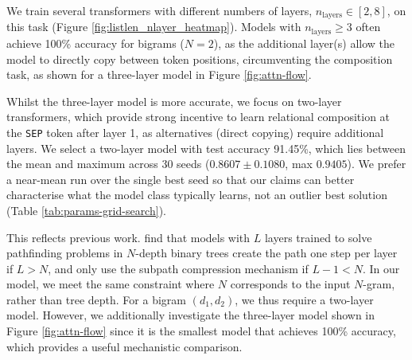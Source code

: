 We train several transformers with different numbers of layers, $n_\text{layers} \in [2,8]$, on this task (Figure \ref{fig:listlen_nlayer_heatmap}). 
Models with $n_\text{layers} \geq 3$ often achieve 100\% accuracy for bigrams ($N=2$), as the additional layer(s) allow the model to directly copy between token positions, circumventing the composition task, as shown for a three-layer model in Figure \ref{fig:attn-flow}. 

Whilst the three-layer model is more accurate, 
we focus on two-layer transformers, which provide strong incentive to learn relational composition at the \texttt{SEP} token after layer 1, as alternatives (direct copying) require additional layers. We select a two-layer model with test accuracy 91.45\%, which lies between the mean and maximum across 30 seeds ($0.8607 \pm 0.1080$, max $0.9405$). We prefer a near-mean run over the single best seed so that our claims can better characterise what the model class typically learns, not an outlier best solution (Table \ref{tab:params-grid-search}).

This reflects previous work. \citet{brinkmann2024mechanistic} find that models with $L$ layers trained to solve pathfinding problems in $N$-depth binary trees create the path one step per layer if $L > N$, and only use the subpath compression mechanism if $L-1 < N$. 
In our model, we meet the same constraint where $N$ corresponds to the input $N$-gram, rather than tree depth. For a bigram $(d_1, d_2)$, we thus require a two-layer model.
However, we additionally investigate the three-layer model shown in Figure \ref{fig:attn-flow} since it is the smallest model that achieves 100\% accuracy, which provides a useful mechanistic comparison.

